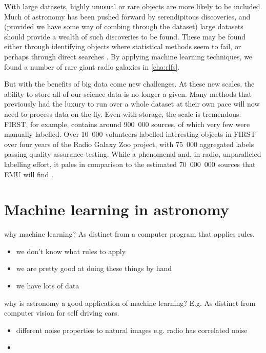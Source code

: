     With large datasets, highly unusual or rare objects are more likely to be included. Much of astronomy has been pushed forward by serendipitous discoveries, and (provided we have some way of combing through the dataset) large datasets should provide a wealth of such discoveries to be found. These may be found either through identifying objects where statistical methods seem to fail, or perhaps through direct searches \citep{norris17unexpected}. By applying machine learning techniques, we found a number of rare giant radio galaxies in \autoref{cha:rlfs}.

    But with the benefits of big data come new challenges. At these new scales, the ability to store all of our science data is no longer a given. Many methods that previously had the luxury to run over a whole dataset at their own pace will now need to process data on-the-fly. Even with storage, the scale is tremendous: FIRST, for example, contains around 900~000 sources, of which very few were manually labelled. Over 10~000 volunteers labelled interesting objects in FIRST over four years of the Radio Galaxy Zoo project, with 75~000 aggregated labels passing quality assurance testing. While a phenomenal and, in radio, unparalleled labelling effort, it pales in comparison to the estimated 70~000~000 sources that EMU will find \citep{banfield15}.

\section{Machine learning in astronomy}
\label{sec:ml-in-astro}

    why machine learning? As distinct from a computer program that applies rules. \begin{itemize}
        \item we don't know what rules to apply
        \item we are pretty good at doing these things by hand
        \item we have lots of data
    \end{itemize}
    why is astronomy a good application of machine learning? E.g. As distinct from computer vision for self driving cars. \begin{itemize}
        \item different noise properties to natural images e.g. radio has correlated noise
        \item 
    \end{itemize}


